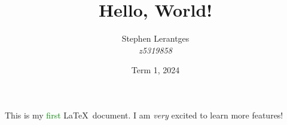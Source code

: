 \documentclass [12pt]{article} %
\title{Hello, World!}
\author{Stephen Lerantges\\\textit{z5319858}}
\date{Term 1, 2024}
\begin{document}
\maketitle

This is my \textcolor{green}{first} \LaTeX\ document. I am \emph{very} excited to learn more features!
\end{document}
